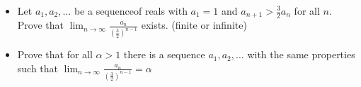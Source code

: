 \begin{itemize}
\item[(a)] Let \(a_1,a_2,\dots\) be a sequenceof reals with \(a_1=1\) and \(a_{n+1}>\frac32 a_n\) for all \(n\). Prove that \(\lim_{n\rightarrow\infty}\frac{a_n}{\left(\frac32\right)^{n-1}}\) exists. (finite or infinite)

\item[(b)] Prove that for all \(\alpha>1\) there is a sequence \(a_1,a_2,\dots\) with the same properties such that \(\lim_{n\rightarrow\infty}\frac{a_n}{\left(\frac32\right)^{n-1}}=\alpha\)
\end{itemize}
